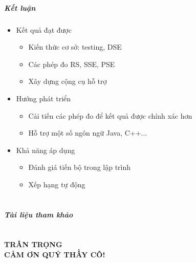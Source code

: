 \documentclass{beamer}
\begin{document}
\begin{frame}
  \frametitle{Kết luận}
	
  \begin{itemize}
  	\item Kết quả đạt được 
  	\begin{itemize}
  		\item Kiến thức cơ sở: testing, DSE
  		\item Các phép đo RS, SSE, PSE
  		\item Xây dựng cộng cụ hỗ trợ
  	\end{itemize} \pause
  	\item Hướng phát triển
  	\begin{itemize}
  		\item Cải tiến các phép đo để kết quả được chính xác hơn
  		\item Hỗ trợ một số ngôn ngữ Java, C++...
  	\end{itemize} \pause
  	\item Khả năng áp dụng
  	\begin{itemize}
  		\item Đánh giá tiến bộ trong lập trình
  		\item Xếp hạng tự động
  	\end{itemize}
  \end{itemize}
\end{frame}


\part{}

\begin{frame}
  \frametitle{Tài liệu tham khảo}
  
  {\footnotesize}
\end{frame}

\part{}
\begin{frame}
  \begin{center}
    \begin{Huge}
      \textcolor{BlueGreen}{\textbf{TRÂN TRỌNG \\ CẢM ƠN QUÝ THẦY CÔ!}}
    \end{Huge}
\end{center}

\end{frame}

\end{document}
